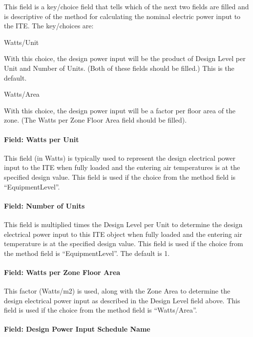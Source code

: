 This field is a key/choice field that tells which of the next two fields are filled and is descriptive of the method for calculating the nominal electric power input to the ITE. The key/choices are:

Watts/Unit

With this choice, the design power input will be the product of Design Level per Unit and Number of Units. (Both of these fields should be filled.) This is the default.

Watts/Area

With this choice, the design power input will be a factor per floor area of the zone. (The Watts per Zone Floor Area field should be filled).

\paragraph{Field: Watts per Unit}\label{field-watts-per-unit}

This field (in Watts) is typically used to represent the design electrical power input to the ITE when fully loaded and the entering air temperatures is at the specified design value. This field is used if the choice from the method field is ``EquipmentLevel''.

\paragraph{Field: Number of Units}\label{field-number-of-units}

This field is multiplied times the Design Level per Unit to determine the design electrical power input to this ITE object when fully loaded and the entering air temperature is at the specified design value. This field is used if the choice from the method field is ``EquipmentLevel''. The default is 1.

\paragraph{Field: Watts per Zone Floor Area}\label{field-watts-per-zone-floor-area-2}

This factor (Watts/m2) is used, along with the Zone Area to determine the design electrical power input as described in the Design Level field above. This field is used if the choice from the method field is ``Watts/Area''.

\paragraph{Field: Design Power Input Schedule Name}\label{field-design-power-input-schedule-name}

